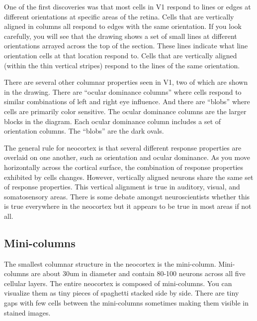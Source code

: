 \documentclass{report}
\begin{document}
One of the first discoveries was that most cells in V1 respond to
lines or edges at different orientations at specific areas of the
retina. Cells that are vertically aligned in columns all respond to
edges with the same orientation. If you look carefully, you will see
that the drawing shows a set of small lines at different orientations
arrayed across the top of the section. These lines indicate what line
orientation cells at that location respond to. Cells that are
vertically aligned (within the thin vertical stripes) respond to the
lines of the same orientation.

There are several other columnar properties seen in V1, two of which
are shown in the drawing. There are ``ocular dominance columns'' where
cells respond to similar combinations of left and right eye
influence. And there are ``blobs'' where cells are primarily color
sensitive. The ocular dominance columns are the larger blocks in the
diagram. Each ocular dominance column includes a set of orientation
columns. The ``blobs'' are the dark ovals.

The general rule for neocortex is that several different response
properties are overlaid on one another, such as orientation and ocular
dominance. As you move horizontally across the cortical surface, the
combination of response properties exhibited by cells
changes. However, vertically aligned neurons share the same set of
response properties. This vertical alignment is true in auditory,
visual, and somatosensory areas. There is some debate amongst
neuroscientists whether this is true everywhere in the neocortex but
it appears to be true in most areas if not all.

\subsection*{Mini-columns}
The smallest columnar structure in the neocortex is the
mini-column. Mini-columns are about 30um in diameter and contain
80-100 neurons across all five cellular layers. The entire neocortex
is composed of mini-columns. You can visualize them as tiny pieces of
spaghetti stacked side by side. There are tiny gaps with few cells
between the mini-columns sometimes making them visible in stained
images.
\end{document}
